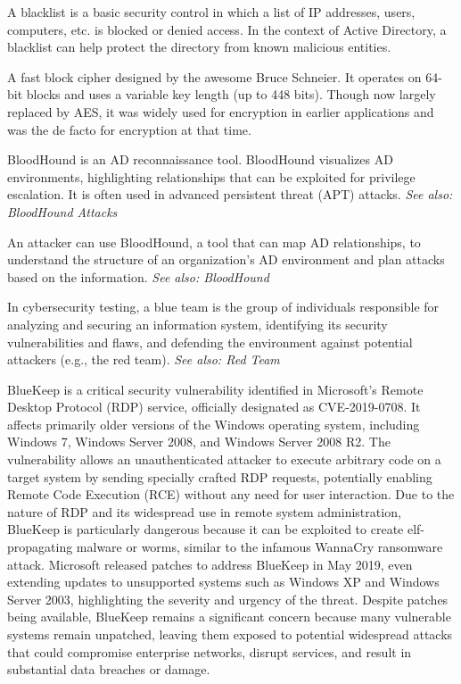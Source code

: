  A blacklist is a basic security control in which a list of IP addresses, users, computers, etc. is blocked or denied access. In the context of Active Directory, a blacklist can help protect the directory from known malicious entities.

 A fast block cipher designed by the awesome Bruce Schneier. It operates on 64-bit blocks and uses a variable key length (up to 448 bits). Though now largely replaced by AES, it was widely used for encryption in earlier applications and was the de facto for encryption at that time.

 BloodHound is an AD reconnaissance tool. BloodHound visualizes AD environments, highlighting relationships that can be exploited for privilege escalation. It is often used in advanced persistent threat (APT) attacks.
\textit{See also: BloodHound Attacks}

 An attacker can use BloodHound, a tool that can map AD relationships, to understand the structure of an organization’s AD environment and plan attacks based on the information.
\textit{See also: BloodHound}

 In cybersecurity testing, a blue team is the group of individuals responsible for analyzing and securing an information system, identifying its security vulnerabilities and flaws, and defending the environment against potential attackers (e.g., the red team).
\textit{See also: Red Team}

 BlueKeep is a critical security vulnerability identified in Microsoft's Remote Desktop Protocol (RDP) service, officially designated as CVE-2019-0708. It affects primarily older versions of the Windows operating system, including Windows 7, Windows Server 2008, and Windows Server 2008 R2. The vulnerability allows an unauthenticated attacker to execute arbitrary code on a target system by sending specially crafted RDP requests, potentially enabling Remote Code Execution (RCE) without any need for user interaction. Due to the nature of RDP and its widespread use in remote system administration, BlueKeep is particularly dangerous because it can be exploited to create elf-propagating malware or worms, similar to the infamous WannaCry ransomware attack. Microsoft released patches to address BlueKeep in May 2019, even extending updates to unsupported systems such as Windows XP and Windows Server 2003, highlighting the severity and urgency of the threat. Despite patches being available, BlueKeep remains a significant concern because many vulnerable systems remain unpatched, leaving them exposed to potential widespread attacks that could compromise enterprise networks, disrupt services, and result in substantial data breaches or damage.

